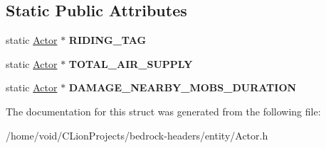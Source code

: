 \subsection*{Static Public Attributes}
\begin{DoxyCompactItemize}
\item 
\mbox{\label{struct_actor_ae213c316f9d26464ebedd5cd7476a32b}} 
static \mbox{\hyperlink{struct_actor}{Actor}} $\ast$ {\bfseries R\+I\+D\+I\+N\+G\+\_\+\+T\+AG}
\item 
\mbox{\label{struct_actor_aa53acf414530c35cc795059a3f8bd5aa}} 
static \mbox{\hyperlink{struct_actor}{Actor}} $\ast$ {\bfseries T\+O\+T\+A\+L\+\_\+\+A\+I\+R\+\_\+\+S\+U\+P\+P\+LY}
\item 
\mbox{\label{struct_actor_a8cd3c8e7bfa4d68acb6a9359d47d9997}} 
static \mbox{\hyperlink{struct_actor}{Actor}} $\ast$ {\bfseries D\+A\+M\+A\+G\+E\+\_\+\+N\+E\+A\+R\+B\+Y\+\_\+\+M\+O\+B\+S\+\_\+\+D\+U\+R\+A\+T\+I\+ON}
\end{DoxyCompactItemize}


The documentation for this struct was generated from the following file\+:\begin{DoxyCompactItemize}
\item 
/home/void/\+C\+Lion\+Projects/bedrock-\/headers/entity/Actor.\+h\end{DoxyCompactItemize}
